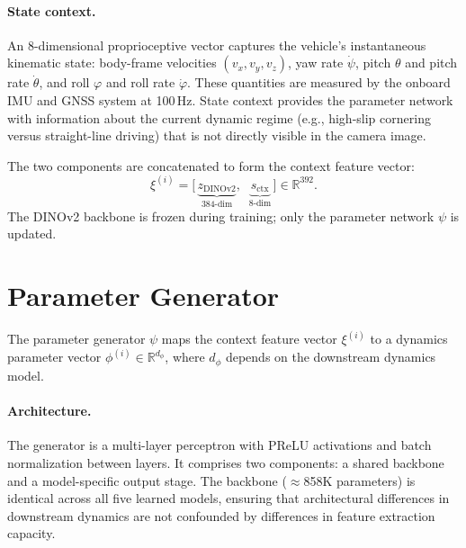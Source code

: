 \paragraph{State context.}
An 8-dimensional proprioceptive vector captures the vehicle's instantaneous kinematic state: body-frame velocities $(v_x, v_y, v_z)$, yaw rate $\dot{\psi}$, pitch $\theta$ and pitch rate $\dot{\theta}$, and roll $\varphi$ and roll rate $\dot{\varphi}$. These quantities are measured by the onboard IMU and GNSS system at 100\,Hz. State context provides the parameter network with information about the current dynamic regime (e.g., high-slip cornering versus straight-line driving) that is not directly visible in the camera image.

The two components are concatenated to form the context feature vector:
\begin{equation}
  \xi^{(i)} = \bigl[\,\underbrace{z_{\text{DINOv2}}}_{\text{384-dim}},\;\; \underbrace{s_{\text{ctx}}}_{\text{8-dim}}\,\bigr] \in \mathbb{R}^{392}.
  \label{eq:context-features}
\end{equation}
The DINOv2 backbone is frozen during training; only the parameter network $\psi$ is updated.

\section{Parameter Generator}
\label{sec:param-generator}

The parameter generator $\psi$ maps the context feature vector $\xi^{(i)}$ to a dynamics parameter vector $\phi^{(i)} \in \mathbb{R}^{d_\phi}$, where $d_\phi$ depends on the downstream dynamics model.

\paragraph{Architecture.}
The generator is a multi-layer perceptron with PReLU activations and batch normalization between layers. It comprises two components: a shared backbone and a model-specific output stage. The backbone ($\approx$858K parameters) is identical across all five learned models, ensuring that architectural differences in downstream dynamics are not confounded by differences in feature extraction capacity.

